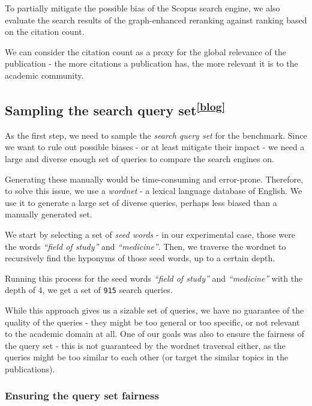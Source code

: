 To partially mitigate the possible bias of the Scopus search engine, 
we also evaluate the search results of the graph-enhanced reranking against 
ranking based on the citation count. 

We can consider the citation count as a proxy for the global relevance of the publication - the more citations a publication has, the more relevant it is to the academic community.

\subsection[Sampling the search query set]{Sampling the search query set\textsuperscript{\href{https://jindrich.bar/edu/thesis-blog/ranking-benchmarks/}{[blog]}}}

As the first step, we need to sample the \textit{search query set} for the benchmark. 
Since we want to rule out possible biases - or at least mitigate their impact - we need a large and diverse enough set of queries to compare the search engines on.

Generating these manually would be time-consuming and error-prone. 
Therefore, to solve this issue, we use a \textit{wordnet} - a lexical language database of English.
We use it to generate a large set of diverse queries, perhaps less biased than a manually generated set.

We start by selecting a set of \textit{seed words} - in our experimental case, those were the words \textit{``field of study''} and \textit{``medicine''}.
Then, we traverse the wordnet to recursively find the hyponyms of those seed words, up to a certain depth.

Running this process for the seed words \textit{``field of study''} and \textit{``medicine''} with the depth of 4, we get a set of \texttt{915} search queries.

While this approach gives us a sizable set of queries, we have no guarantee of the quality of the queries - they might be too general or too specific, or not relevant to the academic domain at all.
One of our goals was also to ensure the fairness of the query set - this is not guaranteed by the wordnet traversal either, as the queries might be too similar to each other (or target the similar topics in the publications).

\subsubsection{Ensuring the query set fairness}

